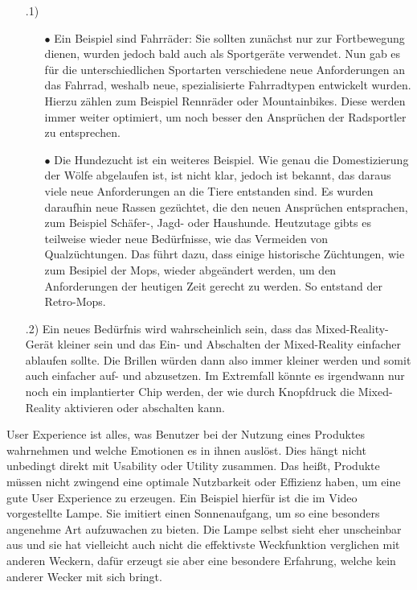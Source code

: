 \documentclass[12pt]{scrartcl}
\begin{document}
\exercise{}
\begin{itemize}
    \item[\theenumi.1)] \begin{itemize}
                            \item[$\bullet$] Ein Beispiel sind Fahrräder: Sie sollten zunächst nur zur Fortbewegung dienen, wurden jedoch bald auch als Sportgeräte verwendet. 
                                             Nun gab es für die unterschiedlichen Sportarten verschiedene neue Anforderungen an das Fahrrad, weshalb neue, spezialisierte Fahrradtypen entwickelt wurden. 
                                             Hierzu zählen zum Beispiel Rennräder oder Mountainbikes. Diese werden immer weiter optimiert, um noch besser den Ansprüchen der Radsportler zu entsprechen.
                            \item[$\bullet$] Die Hundezucht ist ein weiteres Beispiel. Wie genau die Domestizierung der Wölfe abgelaufen ist, ist nicht klar, jedoch ist bekannt,
                                             das daraus viele neue Anforderungen an die Tiere entstanden sind. Es wurden daraufhin neue Rassen gezüchtet, die den neuen Ansprüchen entsprachen,
                                             zum Beispiel Schäfer-, Jagd- oder Haushunde. Heutzutage gibts es teilweise wieder neue Bedürfnisse, wie das Vermeiden von Qualzüchtungen. Das führt dazu, dass
                                             einige historische Züchtungen, wie zum Besipiel der Mops, wieder abgeändert werden, um den Anforderungen der heutigen Zeit gerecht zu werden. So entstand der Retro-Mops.
                        \end{itemize}
    \item[\theenumi.2)] Ein neues Bedürfnis wird wahrscheinlich sein, dass das Mixed-Reality-Gerät kleiner sein und das Ein- und Abschalten der Mixed-Reality einfacher ablaufen sollte.
                        Die Brillen würden dann also immer kleiner werden und somit auch einfacher auf- und abzusetzen. Im Extremfall könnte es irgendwann nur noch ein implantierter Chip werden, der
                        wie durch Knopfdruck die Mixed-Reality aktivieren oder abschalten kann.
\end{itemize}

\setcounter{enumi}{3}
\exercise{}
User Experience ist alles, was Benutzer bei der Nutzung eines Produktes wahrnehmen und welche Emotionen es in ihnen auslöst.
Dies hängt nicht unbedingt direkt mit Usability oder Utility zusammen. Das heißt, Produkte müssen nicht 
zwingend eine optimale Nutzbarkeit oder Effizienz haben, um eine gute User Experience zu erzeugen. Ein Beispiel 
hierfür ist die im Video vorgestellte Lampe. Sie imitiert einen Sonnenaufgang, um so eine besonders angenehme Art aufzuwachen zu bieten.
Die Lampe selbst sieht eher unscheinbar aus und sie hat vielleicht auch nicht die effektivste Weckfunktion verglichen mit anderen Weckern, dafür erzeugt sie 
aber eine besondere Erfahrung, welche kein anderer Wecker mit sich bringt.
\end{document}
